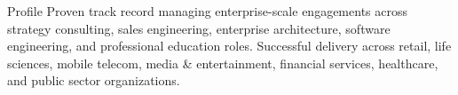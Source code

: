 \documentclass{resume} %
\begin{document}
\begin{rSection}{Profile}
Proven track record managing enterprise-scale engagements across strategy consulting, sales engineering, enterprise architecture, software engineering, and professional education roles. Successful delivery across retail, life sciences, mobile telecom, media \& entertainment, financial services, healthcare, and public sector organizations.

\end{rSection}
\end{document}
